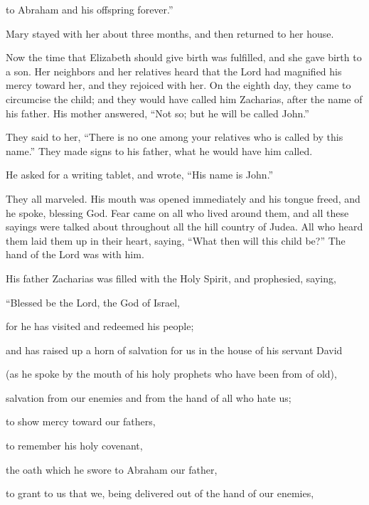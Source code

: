 {\par }{\QB to Abraham and his offspring forever.”
\par }{\PP {}Mary stayed with her about three months, and then returned to her house.
\par }{\PP {}Now the time that Elizabeth should give birth was fulfilled, and she gave birth to a son.
Her neighbors and her relatives heard that the Lord had magnified his mercy toward her, and they rejoiced with her.
On the eighth day, they came to circumcise the child; and they would have called him Zacharias, after the name of his father.
His mother answered, “Not so; but he will be called John.”
\par }{\PP {}They said to her, “There is no one among your relatives who is called by this name.”
They made signs to his father, what he would have him called.
\par }{\PP {}He asked for a writing tablet, and wrote, “His name is John.”
\par }{\PP They all marveled.
His mouth was opened immediately and his tongue freed, and he spoke, blessing God.
Fear came on all who lived around them, and all these sayings were talked about throughout all the hill country of Judea.
All who heard them laid them up in their heart, saying, “What then will this child be?” The hand of the Lord was with him.
\par }{\PP {}His father Zacharias was filled with the Holy Spirit, and prophesied, saying,
\par }{\Q {}“Blessed be the Lord, the God of Israel,
\par }{\QB for he has visited and redeemed his people;
\par }{\Q {}and has raised up a horn of salvation for us in the house of his servant David
\par }{\QB {}(as he spoke by the mouth of his holy prophets who have been from of old),
\par }{\QB {}salvation from our enemies and from the hand of all who hate us;
\par }{\Q {}to show mercy toward our fathers,
\par }{\QB to remember his holy covenant,
\par }{\Q {}the oath which he swore to Abraham our father,
\par }{\QB {}to grant to us that we, being delivered out of the hand of our enemies,
}
